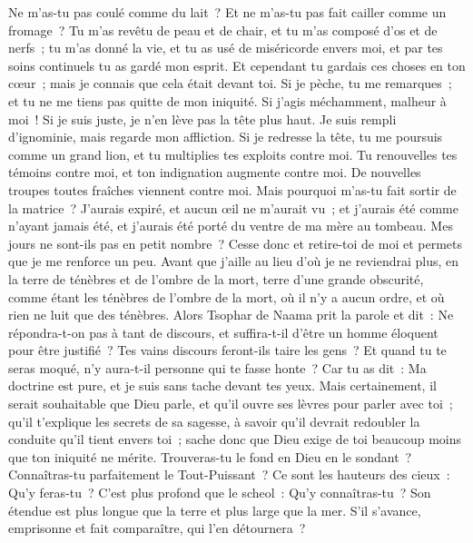 \begin{multicols}{2}
Ne m'as-tu pas coulé comme du lait~? Et ne m'as-tu pas fait cailler comme un fromage~?
Tu m'as revêtu de peau et de chair, et tu m'as composé d'os et de nerfs~;
tu m'as donné la vie, et tu as usé de miséricorde envers moi, et par tes soins continuels tu as gardé mon esprit.
Et cependant tu gardais ces choses en ton cœur~; mais je connais que cela était devant toi. 
Si je pèche, tu me remarques~; et tu ne me tiens pas quitte de mon iniquité.
Si j'agis méchamment, malheur à moi~! Si je suis juste, je n'en lève pas la tête plus haut. Je suis rempli d'ignominie, mais regarde mon affliction. 
Si je redresse la tête, tu me poursuis comme un grand lion, et tu multiplies tes exploits contre moi.
Tu renouvelles tes témoins contre moi, et ton indignation augmente contre moi. De nouvelles troupes toutes fraîches viennent contre moi.
Mais pourquoi m'as-tu fait sortir de la matrice~? J'aurais expiré, et aucun œil ne m'aurait vu~;
et j'aurais été comme n'ayant jamais été, et j'aurais été porté du ventre de ma mère au tombeau.
Mes jours ne sont-ils pas en petit nombre~? Cesse donc et retire-toi de moi et permets que je me renforce un peu.
Avant que j'aille au lieu d'où je ne reviendrai plus, en la terre de ténèbres et de l'ombre de la mort,
terre d'une grande obscurité, comme étant les ténèbres de l'ombre de la mort, où il n'y a aucun ordre, et où rien ne luit que des ténèbres. 
\VerseOne{}Alors Tsophar de Naama prit la parole et dit~:
Ne répondra-t-on pas à tant de discours, et suffira-t-il d'être un homme éloquent pour être justifié~?
Tes vains discours feront-ils taire les gens~? Et quand tu te seras moqué, n'y aura-t-il personne qui te fasse honte~?
Car tu as dit~: Ma doctrine est pure, et je suis sans tache devant tes yeux. 
Mais certainement, il serait souhaitable que Dieu parle, et qu'il ouvre ses lèvres pour parler avec toi~;
qu'il t'explique les secrets de sa sagesse, à savoir qu'il devrait redoubler la conduite qu'il tient envers toi~; sache donc que Dieu exige de toi beaucoup moins que ton iniquité ne mérite.
Trouveras-tu le fond en Dieu en le sondant~? Connaîtras-tu parfaitement le Tout-Puissant~? 
Ce sont les hauteurs des cieux~: Qu'y feras-tu~? C'est plus profond que le scheol~: Qu'y connaîtras-tu~?
Son étendue est plus longue que la terre et plus large que la mer.
S'il s'avance, emprisonne et fait comparaître, qui l'en détournera~?

\end{multicols}
